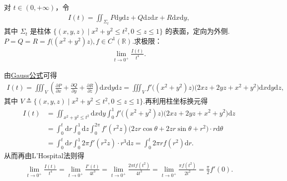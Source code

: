 \documentclass[../../main.tex]{subfiles}%
\begin{document}
\begin{example}
对 $t\in(0,+\infty)$，令
\begin{align*}
I(t)=\iint_{\Sigma_t} P\mathrm{d}y\mathrm{d}z+Q\mathrm{d}z\mathrm{d}x+R\mathrm{d}x\mathrm{d}y,
\end{align*}
其中 $\Sigma_t$ 是柱体 $\{(x,y,z)\mid x^2+y^2\leqslant t^2,0\leqslant z\leqslant 1\}$ 的表面，定向为外侧.$P = Q = R = f\big((x^2+y^2)z\big), f \in C^1(\mathbb{R})$.求极限：
\begin{align*}
\lim\limits_{t\to0^+}\frac{I(t)}{t^4}.
\end{align*}
\end{example}
\begin{solution}
由\hyperref[theorem:Gauss公式--数分]{Gauss公式}可得
\begin{align*}
I(t)=\iiint_V \left(\frac{\partial P}{\partial x}+\frac{\partial Q}{\partial y}+\frac{\partial R}{\partial z}\right)\mathrm{d}x\mathrm{d}y\mathrm{d}z=\iiint_V f'\big((x^2+y^2)z\big)\big(2xz+2yz+x^2+y^2\big)\mathrm{d}x\mathrm{d}y\mathrm{d}z,
\end{align*}
其中 $V\triangleq\{(x,y,z)\mid x^2+y^2\leqslant t^2,0\leqslant z\leqslant1\}$.再利用柱坐标换元得
\begin{align*}
I(t)&=\iint_{x^2+y^2\leqslant t^2}\mathrm{d}x\mathrm{d}y\int_0^1 f'\big((x^2+y^2)z\big)\big(2xz+2yz+x^2+y^2\big)\mathrm{d}z\\
&=\int_0^t \mathrm{d}r\int_0^1 \mathrm{d}z\int_0^{2\pi} f'(r^2z)\big(2zr\cos\theta+2zr\sin\theta+r^2\big)\cdot r\mathrm{d}\theta\\
&=\int_0^t \mathrm{d}r\int_0^1 2\pi f'(r^2z)\cdot r^3\mathrm{d}z
=\int_0^t 2\pi r f(r^2)\mathrm{d}r.
\end{align*}
从而再由L'Hospital法则得
\begin{align*}
\lim_{t\to0^+}\frac{I(t)}{t^4}=\lim_{t\to0^+}\frac{I'(t)}{4t^3}=\lim_{t\to0^+}\frac{2\pi t f(t^2)}{4t^3}=\lim_{t\to0^+}\frac{\pi f(t^2)}{2t^2}=\frac{\pi}{2}f'(0).
\end{align*}
\end{solution}
\end{document}
